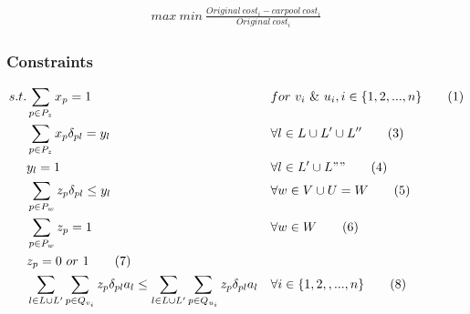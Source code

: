 \begin{align*}
  max\ min\ \frac{Original\ cost_i - carpool\ cost_i}{Original\ cost_i}
\end{align*}

\subsubsection*{Constraints}

\begin{align*}
  s.t. & \sum\limits_{p \in P_z} x_p = 1 && for\ v_i \ \& \ u_i, i \in \{1,2,...,n\} \tag{1} \\
  & \sum\limits_{p \in P_z} x_p \delta_{pl} = y_l && \forall l \in L \cup L' \cup L'' \tag{3} \\
  & y_l = 1 && \forall l \in L' \cup L"" \tag{4} \\
  & \sum\limits_{p \in P_w} z_p \delta_{pl} \leq y_l && \forall w \in V \cup U = W \tag{5} \\
  & \sum\limits_{p \in P_w} z_p = 1 && \forall w \in W \tag{6} \\
  & z_p = 0 \ or \ 1 \tag{7} \\
  & \sum\limits_{l \in L \cup L'} \sum\limits_{p \in Q_{v_i}} z_p \delta_{pl} a_l \leq \sum\limits_{l \in L \cup L'} \sum\limits_{p \in Q_{u_i}} z_p \delta_{pl} a_l && \forall i \in \{1,2,,...,n\} \tag{8} \\
\end{align*}

